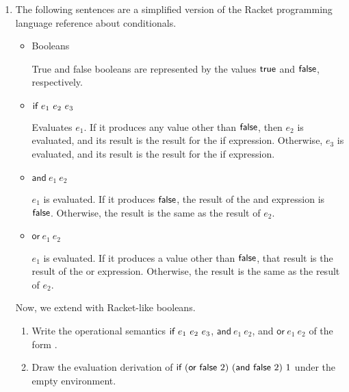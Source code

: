 \begin{enumerate}
\item The following sentences are a simplified version of the Racket programming
  language reference about
  conditionals.

\newcommand{\eand}[2]{\textsf{and}\ #1\ #2}
\newcommand{\eor}[2]{\textsf{or}\ #1\ #2}

\begin{itemize}
  \item Booleans

    True and false booleans are represented by the values $\textsf{true}$ and
    $\textsf{false}$, respectively.

  \item $\textsf{if}\ e_1\ e_2\ e_3$

    Evaluates $e_1$. If it produces any value other than $\textsf{false}$, then $e_2$ is
    evaluated, and its result is the result for the \textsf{if} expression.
    Otherwise, $e_3$ is evaluated, and its result is the result for the
    \textsf{if} expression.

  \item $\eand{e_1}{e_2}$

    $e_1$ is evaluated. If it produces $\textsf{false}$, the result of the \textsf{and}
    expression is $\textsf{false}$. Otherwise, the result is the same as the result of
    $e_2$.

  \item $\eor{e_1}{e_2}$

    $e_1$ is evaluated. If it produces a value other than $\textsf{false}$, that result
    is the result of the \textsf{or} expression. Otherwise, the result is the
    same as the result of $e_2$.

\end{itemize}

Now, we extend \lang with Racket-like booleans.

\begin{enumerate}
  \item
    Write the operational semantics
    $\textsf{if}\ e_1\ e_2\ e_3$, $\eand{e_1}{e_2}$, and $\eor{e_1}{e_2}$
    of the form .
  \item
    Draw the evaluation derivation of
    $\eif{(\eor{\false}{2})}{(\eand{\false}{2})}{1}$
    under the empty environment.
\end{enumerate}

\end{enumerate}
